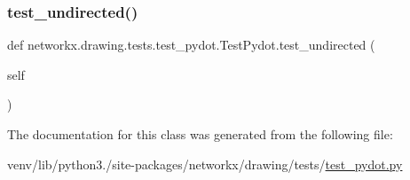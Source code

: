 \subsubsection{\texorpdfstring{test\+\_\+undirected()}{test\_undirected()}}
{\footnotesize\ttfamily def networkx.\+drawing.\+tests.\+test\+\_\+pydot.\+Test\+Pydot.\+test\+\_\+undirected (\begin{DoxyParamCaption}\item[{}]{self }\end{DoxyParamCaption})}



The documentation for this class was generated from the following file\+:\begin{DoxyCompactItemize}
\item 
venv/lib/python3./site-\/packages/networkx/drawing/tests/\hyperlink{test__pydot_8py}{test\+\_\+pydot.\+py}\end{DoxyCompactItemize}
